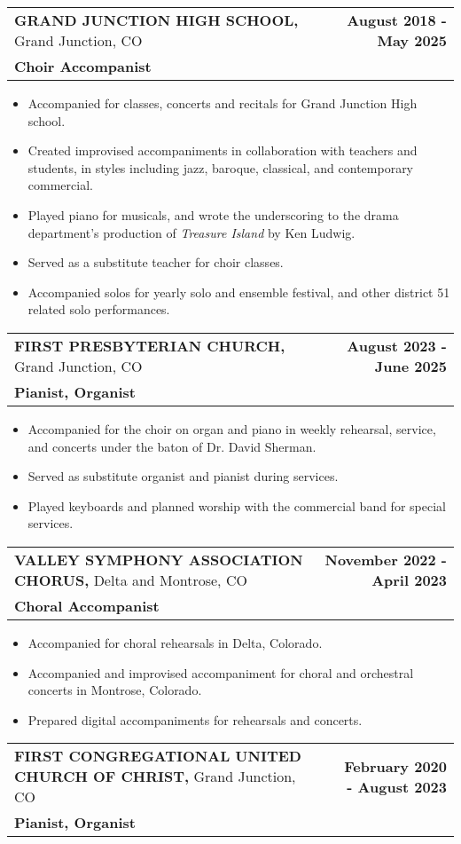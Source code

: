 \documentclass{article}
\makeatletter
\newcommand{\cvItem}[1]{
        \item {
            {#1}
        }
    }
\newcommand{\cvSubheading}[4]{
        \vspace{-1pt}\item[]
            \begin{tabular*}{1\textwidth}[t]{l@{\extracolsep{\fill}}r}
                \textbf{#1} #2 & \textbf{#3} \\
                \textbf{#4}\\
            \end{tabular*}\vspace{-5pt}
    }
\newcommand{\cvItemListStart}{\begin{itemize}[leftmargin=10pt]}
\newcommand{\cvItemListEnd}{\end{itemize}}
\makeatother
\begin{document}
            \cvSubheading
            {GRAND JUNCTION HIGH SCHOOL,}{Grand Junction, CO} {August 2018 - May 2025}
            {Choir Accompanist}
                \cvItemListStart
                    \cvItem
                        {Accompanied for classes, concerts and recitals for Grand Junction High
                        school.}
                    \cvItem
                        {Created improvised accompaniments in collaboration with teachers and
                        students, in styles including jazz, baroque, classical, and contemporary
                        commercial.}
                    \cvItem
                        {Played piano for musicals, and wrote the underscoring to the drama
                        department's production of \textit{Treasure Island} by Ken Ludwig.}
                    \cvItem
                        {Served as a substitute teacher for choir classes.}
                    \cvItem
                        {Accompanied solos for yearly solo and ensemble festival, and other district
                        51 related solo performances.}
                \cvItemListEnd
            \pagebreak
            \cvSubheading
            {FIRST PRESBYTERIAN CHURCH,}{Grand Junction, CO}{August 2023 - June 2025}
            {Pianist, Organist}
                \cvItemListStart
                    \cvItem
                        {Accompanied for the choir on organ and piano in weekly rehearsal, service,
                        and concerts under the baton of Dr. David Sherman.}
                    \cvItem
                        {Served as substitute organist and pianist during services.}
                    \cvItem
                        {Played keyboards and planned worship with the commercial band for special
                        services.}
                \cvItemListEnd
            \cvSubheading
            {VALLEY SYMPHONY ASSOCIATION CHORUS,}{Delta and Montrose, CO}{November 2022 - April
            2023}{Choral Accompanist}
                \cvItemListStart
                    \cvItem
                        {Accompanied for choral rehearsals in Delta, Colorado.}
                    \cvItem
                        {Accompanied and improvised accompaniment for choral and orchestral concerts
                        in Montrose, Colorado.}
                    \cvItem
                        {Prepared digital accompaniments for rehearsals and concerts.}
                \cvItemListEnd
            \cvSubheading
            {FIRST CONGREGATIONAL UNITED CHURCH OF CHRIST,}{Grand Junction, CO}{February 2020 -
            August 2023}{Pianist, Organist}
\end{document}
